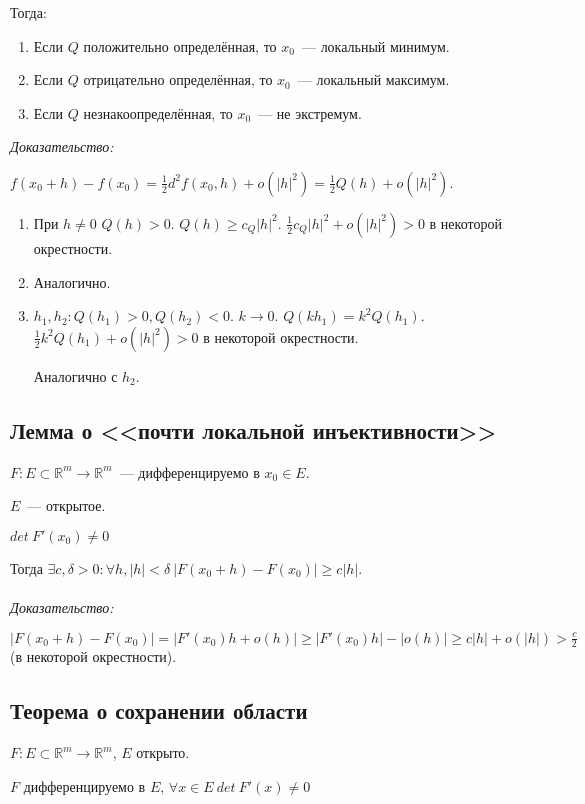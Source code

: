 \documentclass[paper=a4, fontsize=11pt]{article}
\begin{document}
Тогда:
\begin{enumerate}
    \item Если $Q$ положительно определённая, то $x_0$~--- локальный минимум.
    \item Если $Q$ отрицательно определённая, то $x_0$~--- локальный максимум.
    \item Если $Q$ незнакоопределённая, то $x_0$~--- не экстремум.
\end{enumerate}

\emph{Доказательство:}

$f(x_0+h) - f(x_0) = \frac{1}{2}d^2f(x_0,h) + o(|h|^2) = \frac{1}{2}Q(h) + o(|h|^2)$.

\begin{enumerate}
    \item При $h \neq 0$ $Q(h) > 0$. $Q(h) \geq c_Q|h|^2$. $\frac{1}{2}c_Q|h|^2 + o(|h|^2) > 0$ в некоторой окрестности.
    \item Аналогично.
    \item $h_1,h_2: Q(h_1) > 0, Q(h_2) < 0$. $k \to 0$. $Q(kh_1) = k^2 Q(h_1)$. $\frac{1}{2}k^2Q(h_1) + o(|h|^2) > 0$ в некоторой окрестности.
    
    Аналогично с $h_2$.
\end{enumerate}

\subsection{Лемма о <<почти локальной инъективности>>}
$F: E \subset \mathds{R}^m \rightarrow \mathds{R}^m$~--- дифференцируемо в $x_0 \in E$.

$E$~--- открытое.

$det\ F'(x_0) \neq 0$

Тогда $\exists c,\delta>0: \forall h,|h|<\delta\ |F(x_0+h)-F(x_0)| \geq c|h|$.
\\\\
\emph{Доказательство:}

$|F(x_0+h)-F(x_0)| = |F'(x_0)h + o(h)| \geq |F'(x_0)h| - |o(h)| \geq c|h| + o(|h|) > \frac{c}{2}$ (в некоторой окрестности).

\subsection{Теорема о сохранении области}
$F: E \subset \mathds{R}^m \rightarrow \mathds{R}^m$, $E$ открыто.

$F$ дифференцируемо в $E$, $\forall x \in E\ det\ F'(x) \neq 0$
\end{document}
